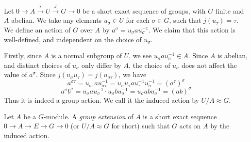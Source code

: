 


\begin{analysis}
    Let $0\to A\xrightarrow iU\xrightarrow jG\to 0$ be a short exact sequence of groups, with $G$ finite and $A$ abelian. We take any elements $u_\sigma\in U$ for each $\sigma\in G$, such that $j(u_\tau)=\tau$. We define an action of $G$ over $A$ by $a^\sigma=u_\sigma au_\sigma^{-1}$. We claim that this action is well-defined, and independent on the choice of $u_\sigma$.

    Firstly, since $A$ is a normal subgroup of $U$, we see $u_\sigma au_\sigma^{-1}\in A$. Since $A$ is abelian, and distinct choices of $u_\sigma$ only differ by $A$, the choice of $u_\sigma$ does not affect the value of $a^\sigma$. Since $j(u_\sigma u_\tau)=j(u_{\sigma\tau})$, we have $$ a^{\sigma\tau}=u_{\sigma\tau}au_{\sigma\tau}^{-1}=u_\sigma u_\tau au_\tau^{-1}u_\sigma^{-1}=(a^\tau)^\sigma $$ $$ a^\sigma b^\sigma=u_\sigma au_\sigma^{-1}\cdot u_\sigma bu_\sigma^{-1}=u_\sigma abu_\sigma^{-1}=(ab)^\sigma $$ Thus it is indeed a group action. We call it the induced action by $U/A\approx G$.
\end{analysis}

\begin{definition}
    Let $A$ be a $G$-module. A \emph{group extension} of $A$ is a short exact sequence $0\to A\to E\to G\to 0$ (or $U/A\approx G$ for short) such that $G$ acts on $A$ by the induced action.
\end{definition}

